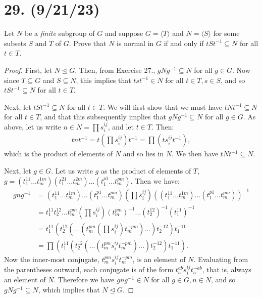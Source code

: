 \documentclass{article}
\begin{document}
\section*{29. (9/21/23)}

Let $N$ be a \emph{finite} subgroup of $G$ and suppose $G = \langle T \rangle$ and $N = \langle S \rangle$ for some subsets $S$ and $T$ of $G$. Prove that $N$ is normal in $G$ if and only if $tSt^{-1} \subseteq N$ for all $t \in T$.

\begin{proof}
    First, let $N \unlhd G$. Then, from Exercise 27., $gNg^{-1} \subseteq N$ for all $g \in G$. Now since $T \subseteq G$ and $S \subseteq N$, this implies that $tst^{-1} \in N$ for all $t \in T, s \in S$, and so $tSt^{-1} \subseteq N$ for all $t \in T$. 

    Next, let $tSt^{-1} \subseteq N$ for all $t \in T$. We will first show that we must have $tNt^{-1} \subseteq N$ for all $t \in T$, and that this subsequently implies that $gNg^{-1} \subseteq N$ for all $g \in G$. As above, let us write $n \in N = \prod s_i^{ij}$, and let $t \in T$. Then:
    \begin{align*}
        tnt^{-1} = t (\prod s_i^{ij}) t^{-1} = \prod (t s_i^{ij} t^{-1}),
    \end{align*}
    which is the product of elements of $N$ and so lies in $N$. We then have $tNt^{-1} \subseteq N$.

    Next, let $g \in G$. Let us write $g$ as the product of elements of $T$, $g = (t_1^{11}...t_m^{1m})(t_1^{21}...t_m^{2m})...(t_1^{p1}...t_m^{pm})$. Then we have:
    \begin{align*}
        gng^{-1} &= (t_1^{11}...t_m^{1m})...(t_1^{p1}...t_m^{pm}) (\prod s_i^{ij}) ((t_1^{11}...t_m^{1m})...(t_1^{p1}...t_m^{pm}))^{-1} \\
        &= t_1^{11}t_2^{12}...t_m^{pm} (\prod s_i^{ij}) (t_m^{pm})^{-1}...(t_2^{12})^{-1}(t_1^{11})^{-1} \\
        &= t_1^{11}(t_2^{12}(...(t_m^{pm} (\prod s_i^{ij}) t_m^{-pm})...)t_2^{-12})t_1^{-11} \\
        &= \prod (t_1^{11}(t_2^{12}(...(t_m^{pm} s_i^{ij} t_m^{-pm})...)t_2^{-12})t_1^{-11}).
    \end{align*}
    Now the inner-most conjugate, $t_m^{pm} s_i^{ij} t_m^{-pm}$, is an element of $N$. Evaluating from the parentheses outward, each conjugate is of the form $t_a^{ab} s_i^{ij} t_a^{-ab}$, that is, always an element of $N$. Therefore we have $gng^{-1} \in N$ for all $g \in G, n \in N$, and so $gNg^{-1} \subseteq N$, which implies that $N \unlhd G$.
\end{proof}
\end{document}
